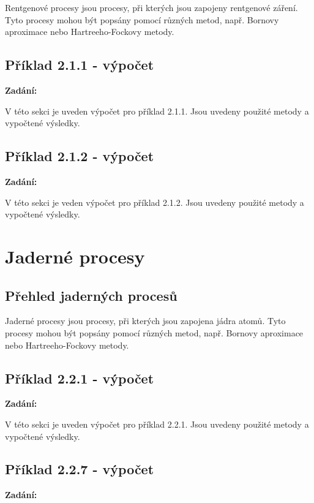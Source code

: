 \documentclass{article}
\newenvironment{zadani}
{\begin{center}\textbf{Zadání:}\itshape}{\end{center}}
\begin{document}
Rentgenové procesy jsou procesy, při kterých jsou zapojeny rentgenové záření. Tyto procesy mohou být popsány pomocí různých metod, např. Bornovy aproximace nebo Hartreeho-Fockovy metody.

\subsection{Příklad 2.1.1 - výpočet}
\begin{zadani}

\end{zadani}


V této sekci je uveden výpočet pro příklad 2.1.1. Jsou uvedeny použité metody a vypočtené výsledky.

\subsection{Příklad 2.1.2 - výpočet}
\begin{zadani}

\end{zadani}


V této sekci je veden výpočet pro příklad 2.1.2. Jsou uvedeny použité metody a vypočtené výsledky.

\section{Jaderné procesy}

\subsection{Přehled jaderných procesů}

Jaderné procesy jsou procesy, při kterých jsou zapojena jádra atomů. Tyto procesy mohou být popsány pomocí různých metod, např. Bornovy aproximace nebo Hartreeho-Fockovy metody.

\subsection{Příklad 2.2.1 - výpočet}
\begin{zadani}

\end{zadani}


V této sekci je uveden výpočet pro příklad 2.2.1. Jsou uvedeny použité metody a vypočtené výsledky.

\subsection{Příklad 2.2.7 - výpočet}
\begin{zadani}

\end{zadani}
\end{document}
